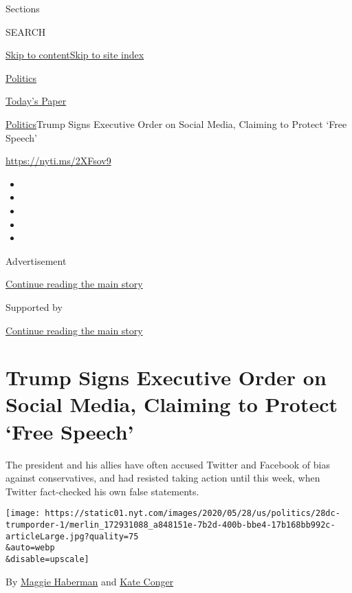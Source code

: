 Sections

SEARCH

\protect\hyperlink{site-content}{Skip to
content}\protect\hyperlink{site-index}{Skip to site index}

\href{https://www.nytimes.com/section/politics}{Politics}

\href{https://myaccount.nytimes.com/auth/login?response_type=cookie\&client_id=vi}{}

\href{https://www.nytimes.com/section/todayspaper}{Today's Paper}

\href{/section/politics}{Politics}\textbar{}Trump Signs Executive Order
on Social Media, Claiming to Protect `Free Speech'

\url{https://nyti.ms/2XFsov9}

\begin{itemize}
\item
\item
\item
\item
\item
\end{itemize}

Advertisement

\protect\hyperlink{after-top}{Continue reading the main story}

Supported by

\protect\hyperlink{after-sponsor}{Continue reading the main story}

\hypertarget{trump-signs-executive-order-on-social-media-claiming-to-protect-free-speech}{%
\section{Trump Signs Executive Order on Social Media, Claiming to
Protect `Free
Speech'}\label{trump-signs-executive-order-on-social-media-claiming-to-protect-free-speech}}

The president and his allies have often accused Twitter and Facebook of
bias against conservatives, and had resisted taking action until this
week, when Twitter fact-checked his own false statements.

\texttt{[image: https://static01.nyt.com/images/2020/05/28/us/politics/28dc-trumporder-1/merlin\_172931088\_a848151e-7b2d-400b-bbe4-17b168bb992c-articleLarge.jpg?quality=75\\\&auto=webp\\\&disable=upscale]}

By \href{https://www.nytimes.com/by/maggie-haberman}{Maggie Haberman}
and \href{https://www.nytimes.com/by/kate-conger}{Kate Conger}

